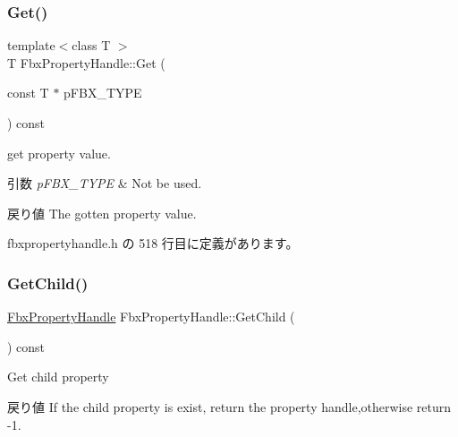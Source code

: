 \subsubsection{\texorpdfstring{Get()}{Get()}\hspace{0.1cm}{\footnotesize\ttfamily [2/2]}}
{\footnotesize\ttfamily template$<$class T $>$ \\
T Fbx\+Property\+Handle\+::\+Get (\begin{DoxyParamCaption}\item[{const T $\ast$}]{p\+F\+B\+X\+\_\+\+T\+Y\+PE }\end{DoxyParamCaption}) const\hspace{0.3cm}{\ttfamily [inline]}}

get property value. 
\begin{DoxyParams}{引数}
{\em p\+F\+B\+X\+\_\+\+T\+Y\+PE} & Not be used. \\
\hline
\end{DoxyParams}
\begin{DoxyReturn}{戻り値}
The gotten property value. 
\end{DoxyReturn}


 fbxpropertyhandle.\+h の 518 行目に定義があります。

\mbox{\label{class_fbx_property_handle_a6160671cde8bff49fe5552ea9bdde1cd}} 
\subsubsection{\texorpdfstring{Get\+Child()}{GetChild()}}
{\footnotesize\ttfamily \hyperlink{class_fbx_property_handle}{Fbx\+Property\+Handle} Fbx\+Property\+Handle\+::\+Get\+Child (\begin{DoxyParamCaption}{ }\end{DoxyParamCaption}) const}

Get child property \begin{DoxyReturn}{戻り値}
If the child property is exist, return the property handle,otherwise return -\/1. 
\end{DoxyReturn}
\mbox{\label{class_fbx_property_handle_a921ee7d24d875d04ae00037b7e9fb4dc}} 
